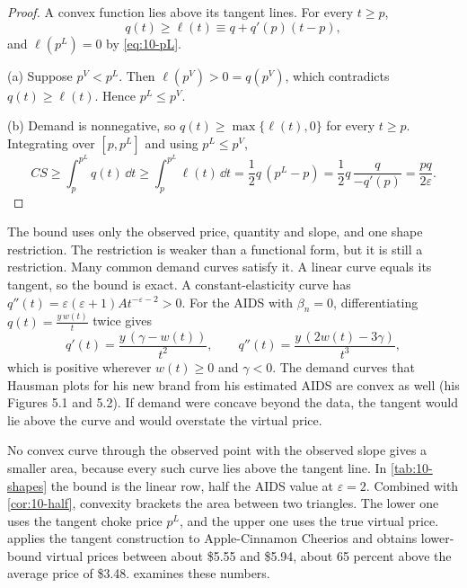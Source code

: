 \begin{proof}
A convex function lies above its tangent lines. For every $t \ge p$,
\begin{equation*}
  q(t) \ge \ell(t) \equiv q + q'(p)(t - p),
\end{equation*}
and $\ell(p^L) = 0$ by \eqref{eq:10-pL}.

(a) Suppose $p^V < p^L$. Then $\ell(p^V) > 0 = q(p^V)$, which contradicts $q(t) \ge \ell(t)$. Hence
$p^L \le p^V$.

(b) Demand is nonnegative, so $q(t) \ge \max\{\ell(t),0\}$ for every $t \ge p$. Integrating over $[p,p^L]$
and using $p^L \le p^V$,
\begin{equation*}
  CS \ge \int_p^{p^L}q(t)\,\dd t \ge \int_p^{p^L}\ell(t)\,\dd t = \frac{1}{2}q\,(p^L - p)
  = \frac{1}{2}q\,\frac{q}{-q'(p)} = \frac{pq}{2\varepsilon}.
\end{equation*}
\end{proof}

The bound uses only the observed price, quantity and slope, and one shape restriction. The restriction is
weaker than a functional form, but it is still a restriction. Many common demand curves satisfy it. A linear
curve equals its tangent, so the bound is exact. A constant-elasticity curve has
$q''(t) = \varepsilon(\varepsilon + 1)At^{-\varepsilon-2} > 0$. For the AIDS with $\beta_n = 0$, differentiating
$q(t) = \frac{y\,w(t)}{t}$ twice gives
\begin{equation*}
  q'(t) = \frac{y\,(\gamma - w(t))}{t^2}, \qquad q''(t) = \frac{y\,(2w(t) - 3\gamma)}{t^3},
\end{equation*}
which is positive wherever $w(t) \ge 0$ and $\gamma < 0$. The demand curves that Hausman plots for his new
brand from his estimated AIDS are convex as well (his Figures 5.1 and 5.2). If demand were concave beyond the
data, the tangent would lie above the curve and would overstate the virtual price.

No convex curve through the observed point with the observed slope gives a smaller area, because every such
curve lies above the tangent line. In \cref{tab:10-shapes} the bound is the linear row, half the
AIDS value at $\varepsilon = 2$. Combined with \cref{cor:10-half}, convexity brackets the area between two
triangles. The lower one uses the tangent choke price $p^L$, and the upper one uses the true virtual price.
\citet[p.~228]{Hausman1997} applies the tangent construction to Apple-Cinnamon Cheerios and obtains lower-bound
virtual prices between about \$5.55 and \$5.94, about 65 percent above the average price of \$3.48.
 examines these numbers.


